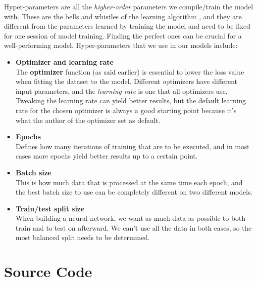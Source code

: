 Hyper-parameters are all the \textit{higher-order} parameters we compile/train the model with. These are the bells and whistles of the learning algorithm \cite{hyperparameters}, and they are different from the parameters learned by training the model and need to be fixed for one session of model training. Finding the perfect ones can be crucial for a well-performing model. Hyper-parameters that we use in our models include:

\begin{itemize}
      \item \textbf{Optimizer and learning rate}\\
          The \textbf{optimizer} function (as said earlier) is essential to lower the loss value when fitting the dataset to the model. 
          Different optimizers have different input parameters, and the \textit{learning rate} is one that all optimizers use. 
          Tweaking the learning rate can yield better results, but the default learning rate for the chosen optimizer is always a good starting point because it's what the author of the optimizer set as default.
      \item \textbf{Epochs}\\
          Defines how many iterations of training that are to be executed, and in most cases more epochs yield better results up to a certain point.
      \item \textbf{Batch size}\\
          This is how much data that is processed at the same time each epoch, and the best batch size to use can be completely different on two different models. 
      \item \textbf{Train/test split size}\\
          When building a neural network, we want as much data as possible to both train and to test on afterward. We can't use all the data in both cases, so the most balanced split needs to be determined.
\end{itemize}

\newpage

\section{Source Code}


